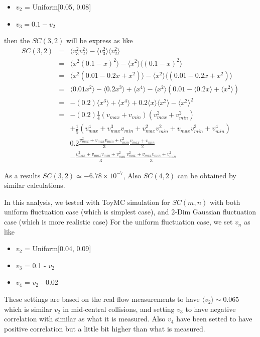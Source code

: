 	\begin{itemize}
	\item $v_2$ = Uniform[0.05, 0.08]
	\item $v_3 = 0.1 - v_2$
	\end{itemize}
	
	then the $SC(3,2)$ will be express as like 
	\begin{eqnarray}
		SC(3,2) &=& \langle v_3^2 v_2^2 \rangle - \langle v_3^2 \rangle \langle v_2^2 \rangle \\
		&=& \langle x^2 (0.1-x)^2 \rangle - \langle x^2 \rangle \langle (0.1-x)^2 \rangle \\
		&=& \langle x^2(0.01 - 0.2x + x^2 ) \rangle - \langle x^2 \rangle \langle (0.01 - 0.2x + x^2 ) \rangle \\
		&=& \langle 0.01x^2 \rangle - \langle 0.2x^3 \rangle + \langle x^4 \rangle - \langle x^2 \rangle ( 0.01 - \langle 0.2 x \rangle + \langle x^2 \rangle ) \\
		&=& - (0.2)\langle x^3 \rangle + \langle x^4 \rangle + 0.2 \langle x \rangle \langle x^2 \rangle - \langle x^2 \rangle^2 \\
		&=& -(0.2) \frac{1}{4}(v_{max}+v_{min})(v_{max}^2 + v_{min}^2) \nonumber \\
		&& +\frac{1}{5}(v_{max}^4 + v_{max}^3v_{min} + v_{max}^2v_{min}^2 + v_{max}v_{min}^3 + v_{min}^4)  \nonumber\\
		&& 0.2\frac{v_{max}^2 + v_{max}v_{min} + v_{min}^2}{3} \frac{v_{max}+v_{min}}{2} \nonumber \\
		&& - \frac{v_{max}^2 + v_{max}v_{min} + v_{min}^2}{3}\frac{v_{max}^2 + v_{max}v_{min} + v_{min}^2}{3}
	\end{eqnarray}

 As a results $SC(3,2) \simeq -6.78 \times 10^{-7}$, Also $SC(4,2)$ can be obtained by similar calculations.

In this analysis, we tested with ToyMC simulation for $SC(m,n)$ with both uniform fluctuation case (which is simplest case), and 2-Dim Gaussian fluctuation case (which is more realistic case)
\smallskip
For the uniform fluctuation case, we set $v_n$ as like 
\begin{itemize}
	\item $v_2$ = Uniform[0.04, 0.09]
	\item $v_3$ = 0.1 - $v_2$
	\item $v_4$ = $v_2$ - 0.02	
\end{itemize}

These settings are based on the real flow measurements to have $\langle v_2 \rangle \sim 0.065$  which is similar $v_2$ in mid-central collisions, and setting $v_3$ to have negative correlation with similar as what it is measured. Also $v_4$ have been setted to have positive correlation but a little bit higher than what is measured.
	
